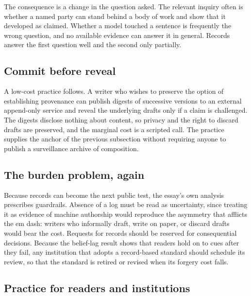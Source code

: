 \documentclass[11pt]{article}
\theoremstyle{plain}
\theoremstyle{definition}
\theoremstyle{remark}
\begin{document}
The consequence is a change in the question asked. The relevant inquiry often is whether a named party can stand behind a body of work and show that it developed as claimed. Whether a model touched a sentence is frequently the wrong question, and no available evidence can answer it in general. Records answer the first question well and the second only partially.

\subsection{Commit before reveal}

A low-cost practice follows. A writer who wishes to preserve the option of establishing provenance can publish digests of successive versions to an external append-only service and reveal the underlying drafts only if a claim is challenged. The digests disclose nothing about content, so privacy and the right to discard drafts are preserved, and the marginal cost is a scripted call. The practice supplies the anchor of the previous subsection without requiring anyone to publish a surveillance archive of composition.

\subsection{The burden problem, again}

Because records can become the next public test, the essay's own analysis prescribes guardrails. Absence of a log must be read as uncertainty, since treating it as evidence of machine authorship would reproduce the asymmetry that afflicts the em dash: writers who informally draft, write on paper, or discard drafts would bear the cost. Requests for records should be reserved for consequential decisions. Because the belief-lag result shows that readers hold on to cues after they fail, any institution that adopts a record-based standard should schedule its review, so that the standard is retired or revised when its forgery cost falls.

\subsection{Practice for readers and institutions}
\end{document}
